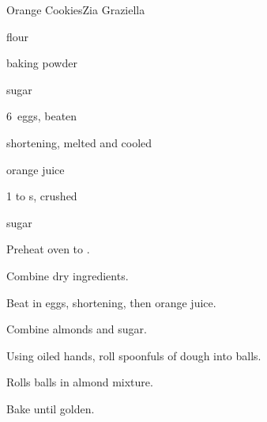 \begin{recipe}{Orange Cookies\FIXME}{Zia Graziella}{}

\begin{ingredients}
\item {} flour
\item {} baking powder
\item {} sugar
\item 6~eggs, beaten
\item \lbs{\half} shortening, melted and cooled
\item {} orange juice
\item 1 to  s, crushed
\item sugar
\end{ingredients}

\begin{directions}
\item Preheat oven to .
\item Combine dry ingredients.
\item Beat in eggs, shortening, then orange juice.
\item Combine almonds and sugar.
\item Using oiled hands, roll spoonfuls of dough into balls.
\item Rolls balls in almond mixture.
\item Bake until golden.
\end{directions}

\end{recipe}
